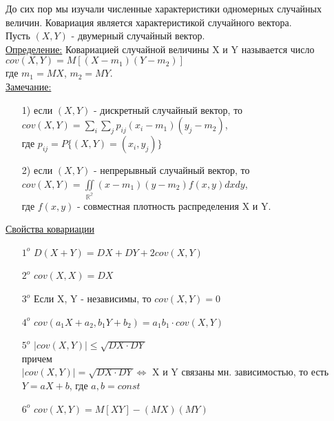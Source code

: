 

До сих пор мы изучали численные характеристики одномерных случайных величин. Ковариация является характеристикой случайного вектора.\\
Пусть $(X,Y)$ - двумерный случайный вектор.\\


\underline{Определение:} Ковариацией случайной величины X и Y называется число\\
$cov(X, Y) = M\left[(X - m_1)(Y - m_2)\right]$\\
где $m_1 = MX$, $m_2 = MY$.\\


\underline{Замечание:}\\
\begin{enumerate}
	\item[1)] если $(X, Y)$ -  дискретный случайный вектор, то\\
	$cov(X, Y) = \sum\limits_i \sum\limits_j p_{ij} (x_i - m_1)(y_j - m_2)$,\\
	где $p_{ij} = P\{(X, Y) = (x_i, y_j)\}$\\
	
	\item[2)] если $(X, Y)$ - непрерывный случайный вектор, то\\
	$\displaystyle  cov(X, Y) = \iint\limits_{\mathbb{R^2}} (x - m_1)(y - m_2) f(x,y) dx dy$,\\
	где $f(x,y)$ - совместная плотность распределения X и Y.\\
\end{enumerate}


\underline{Свойства ковариации}\\
\begin{enumerate}
	\item[$1^o$] $D(X + Y) = DX + DY + 2cov(X, Y)$
	\item[$2^o$] $cov(X, X) = DX$
	\item[$3^o$] Если X, Y - независимы, то $cov(X, Y) = 0$
	\item[$4^o$] $cov(a_1 X + a_2, b_1 Y + b_2) = a_1 b_1 \cdot cov(X, Y)$
	\item[$5^o$] $|cov(X, Y)| \leqslant \sqrt{DX \cdot DY}$\\
	 причем\\
	 $|cov(X, Y)| = \sqrt{DX \cdot DY} \Leftrightarrow$ X и Y связаны мн. зависимостью, то есть  $Y = aX + b$, где $a, b = const$ 
	 \item[$6^o$] $cov(X, Y) = M[XY] - (MX)(MY)$
\end{enumerate}


